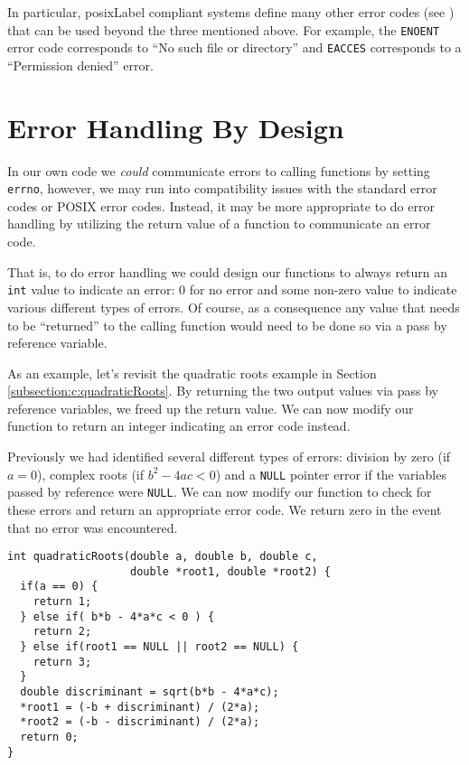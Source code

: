 In particular, \gls{posixLabel} compliant systems define many other error 
codes (see \cite{posixErrno}) that can be used beyond the three
mentioned above.  For example, the \texttt{ENOENT} error
code corresponds to ``No such file or directory'' and \texttt{EACCES}
corresponds to a ``Permission denied'' error.

\section{Error Handling By Design}

In our own code we \emph{could} communicate errors to calling
functions by setting \texttt{errno}, however, we may run 
into compatibility issues with the standard error codes or POSIX 
error codes.  Instead, it may be more appropriate to do error 
handling by utilizing the return value of a function to communicate
an error code.  

That is, to do error handling we could design our functions to always
return an \texttt{int} value to indicate an error: 0 for no error
and some non-zero value to indicate various different types of errors.
Of course, as a consequence any value that needs to be ``returned''
to the calling function would need to be done so via a pass by reference
variable.  

As an example, let's revisit the quadratic roots example in Section
\ref{subsection:c:quadraticRoots}.  By returning the two output values
via pass by reference variables, we freed up the return value.  We
can now modify our function to return an integer indicating an
error code instead.

Previously we had identified several different types of errors: division
by zero (if $a = 0$), complex roots (if $b^2 - 4ac < 0$) and a 
\texttt{NULL} pointer error if the variables passed by reference
were \texttt{NULL}.  We can now modify our function to 
check for these errors and return an appropriate error code.
We return zero in the event that no error was encountered.

\begin{verbatim}
int quadraticRoots(double a, double b, double c, 
                   double *root1, double *root2) {
  if(a == 0) {
    return 1;
  } else if( b*b - 4*a*c < 0 ) {
    return 2;
  } else if(root1 == NULL || root2 == NULL) {
    return 3;
  }
  double discriminant = sqrt(b*b - 4*a*c);
  *root1 = (-b + discriminant) / (2*a);
  *root2 = (-b - discriminant) / (2*a);
  return 0;
}
\end{verbatim}

